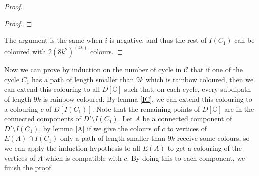 \documentclass[10pt]{article}
\theoremstyle{plain}
\theoremstyle{definition}
\theoremstyle{remark}
\begin{document}
\begin{proof}
\begin{proof}
\end{proof}
%
%

The argument is the same when $i$ is negative, and thus the rest of $I(C_1)$ can be coloured with $2(8k^2)^(4k)$ colours. 
\end{proof}

Now we can prove by induction on the number of cycle in $\mathcal{C}$ that if one of the cycle $C_1$ has a path of length smaller than $9k$
which is rainbow coloured, then we can extend this colouring to all $D[\mathbb{C}]$ such that, on each cycle, every subdipath of length
$9k$ is rainbow coloured. By lemma \ref{IC}, we can extend this colouring to a colouring $c$ of $D[I(C_1)]$.
 Note that the remaining points of $D[\mathbb{C}]$ are in the connected components of $D'\setminus I(C_1)$. 
Let $A$ be a connected component of $D'\setminus I(C_1)$, by lemma \ref{A} if we give the colours of $c$ to vertices of $E(A) \cap I(C_1)$
only a path of length smaller than $9k$ receive some colours, so we can apply the induction hypothesis to all $E(A)$ to get a colouring
of the vertices of $A$ which is compatible with $c$. By doing this to each component, we finish the proof.
\end{document}
